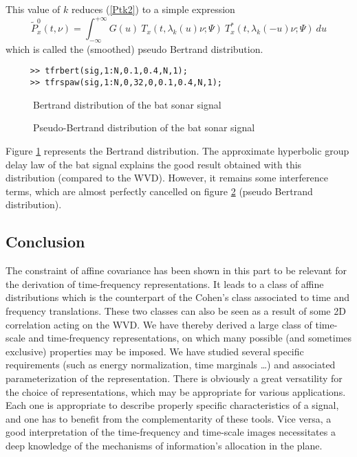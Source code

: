 \begin{itemize}
  This value of $k$ reduces (\ref{Ptk2}) to a simple expression 
\[\tilde{P}_x^0(t,\nu)=\int_{-\infty}^{+\infty} G(u)\
T_x(t,\lambda_k(u)\nu;\Psi) \ T_x^*(t,\lambda_k(-u)\nu;\Psi)\ du\] which is
called the (smoothed) pseudo Bertrand distribution.
\begin{verbatim}
     >> tfrbert(sig,1:N,0.1,0.4,N,1); 
     >> tfrspaw(sig,1:N,0,32,0,0.1,0.4,N,1); 
\end{verbatim}
\begin{figure}[htb]
\epsfxsize=10cm
\epsfysize=8cm
\centerline{}
\caption{\label{En2fig15}Bertrand distribution of the bat sonar signal}
\end{figure}
\begin{figure}[htb]
\epsfxsize=10cm
\epsfysize=8cm
\centerline{}
\caption{\label{En2fig16}Pseudo-Bertrand distribution of the bat sonar
signal}
\end{figure}
Figure \ref{En2fig15} represents the Bertrand distribution. The approximate
hyperbolic group delay law of the bat signal explains the good result
obtained with this distribution (compared to the WVD). However, it remains
some interference terms, which are almost perfectly cancelled on figure
\ref{En2fig16} (pseudo Bertrand distribution).
\end{itemize}

\subsection{Conclusion}
    The constraint of affine covariance has been shown in this part to
be relevant for the derivation of time-frequency representations. It
leads to a class of affine distributions which is the counterpart of
the Cohen's class associated to time and frequency translations. These
two classes can also be seen as a result of some 2D correlation acting
on the WVD. We have thereby derived a large class of time-scale and
time-frequency representations, on which many possible (and sometimes
exclusive) properties may be imposed. We have studied several specific
requirements (such as energy normalization, time marginals \ldots) and
associated parameterization of the representation. There is obviously
a great versatility for the choice of representations, which may be
appropriate for various applications. Each one is appropriate to
describe properly specific characteristics of a signal, and one has to
benefit from the complementarity of these tools. Vice versa, a good
interpretation of the time-frequency and time-scale images
necessitates a deep knowledge of the mechanisms of information's
allocation in the plane.
